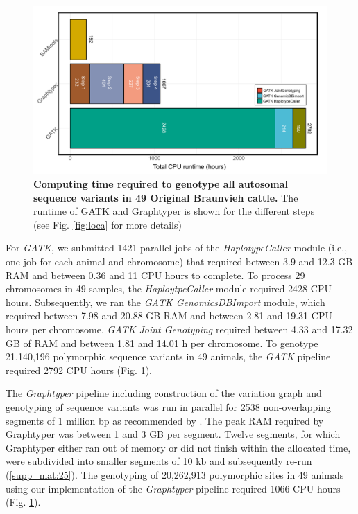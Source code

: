 \documentclass[../main.tex]{subfiles}
\begin{document}
\begin{figure}[!htb]
    \centering
    \includegraphics[width=\textwidth]{paper1/main_figure/Figure4.pdf}
    \caption{\textbf{Computing time required to genotype all autosomal sequence variants in 49 Original Braunvieh cattle.} The runtime of GATK and Graphtyper is shown for the different steps (see Fig. \ref{fig:loca} for more details)}
    \label{fig:varresource}
\end{figure}

For \emph{GATK}, we submitted 1421 parallel jobs of the \emph{HaplotypeCaller} module (i.e., one job for each animal and chromosome) that required between 3.9 and 12.3 GB RAM and between 0.36 and 11 CPU hours to complete.
To process 29 chromosomes in 49 samples, the \emph{HaploytpeCaller} module required 2428 CPU hours. 
Subsequently, we ran the \emph{GATK GenomicsDBImport} module, which required between 7.98 and 20.88 GB RAM and between 2.81 and 19.31 CPU hours per chromosome. 
\emph{GATK Joint Genotyping} required between 4.33 and 17.32 GB of RAM and between 1.81 and 14.01 h per chromosome. 
To genotype 21,140,196 polymorphic sequence variants in 49 animals, the \emph{GATK} pipeline required 2792 CPU hours (Fig. \ref{fig:varresource}).

The \emph{Graphtyper} pipeline including construction of the variation graph and genotyping of sequence variants was run in parallel for 2538 non-overlapping segments of 1 million bp as recommended by \citep{eggertsson2017graphtyper}. 
The peak RAM required by Graphtyper was between 1 and 3 GB per segment. 
Twelve segments, for which Graphtyper either ran out of memory or did not finish within the allocated time, were subdivided into smaller segments of 10 kb and subsequently re-run (\ref{supp_mat:25}).
The genotyping of 20,262,913 polymorphic sites in 49 animals using our implementation of the \emph{Graphtyper} pipeline required 1066 CPU hours (Fig. \ref{fig:varresource}).
\end{document}
